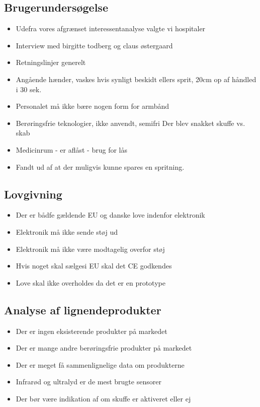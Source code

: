 \documentclass{report}
\begin{document}
\subsection{Brugerundersøgelse}
\begin{itemize}
\item Udefra vores afgrænset interessentanalyse valgte vi hospitaler
\item Interview med birgitte todberg og claus østergaard
\item Retningslinjer generelt 
\item Angående hænder, vaskes hvis synligt beskidt ellers sprit, 20cm op af håndled i 30 sek.
\item Personalet må ikke bære nogen form for armbånd
\item Berøringsfrie teknologier, ikke anvendt, semifri Der blev snakket skuffe vs. skab
\item Medicinrum - er aflåst - brug for lås
\item Fandt ud af at der muligvis kunne spares en spritning.
\end{itemize}
\subsection{Lovgivning}
\begin{itemize}
\item Der er bådfe gældende EU og danske love indenfor elektronik
\item Elektronik må ikke sende støj ud
\item Elektronik må ikke være modtagelig overfor støj
\item Hvis noget skal sælgesi EU skal det CE godkendes
\item Love skal ikke overholdes da det er en prototype
\end{itemize}

\subsection{Analyse af lignendeprodukter}
\begin{itemize}
\item Der er ingen eksisterende produkter på markedet
\item Der er mange andre berøringsfrie produkter på markedet
\item Der er meget få sammenlignelige data om produkterne
\item Infrarød og ultralyd er de mest brugte sensorer
\item Der bør være indikation af om skuffe er aktiveret eller ej
\end{itemize}
\end{document}
